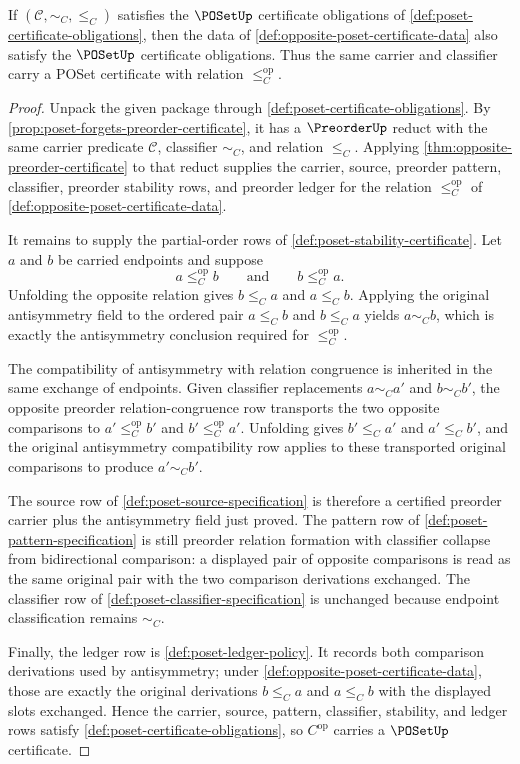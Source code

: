 \begin{theorem}
\label{thm:opposite-poset-certificate}
If $(\mathcal C,\sim_C,\le_C)$ satisfies the $\POSetUp$ certificate obligations of \autoref{def:poset-certificate-obligations}, then the data of \autoref{def:opposite-poset-certificate-data} also satisfy the $\POSetUp$ certificate obligations. Thus the same carrier and classifier carry a POSet certificate with relation $\le_C^{\mathrm{op}}$.
\end{theorem}
\begin{proof}
Unpack the given package through \autoref{def:poset-certificate-obligations}. By \autoref{prop:poset-forgets-preorder-certificate}, it has a $\PreorderUp$ reduct with the same carrier predicate $\mathcal C$, classifier $\sim_C$, and relation $\le_C$. Applying \autoref{thm:opposite-preorder-certificate} to that reduct supplies the carrier, source, preorder pattern, classifier, preorder stability rows, and preorder ledger for the relation $\le_C^{\mathrm{op}}$ of \autoref{def:opposite-poset-certificate-data}.

It remains to supply the partial-order rows of \autoref{def:poset-stability-certificate}. Let $a$ and $b$ be carried endpoints and suppose
$$
a\le_C^{\mathrm{op}} b
\qquad\text{and}\qquad
b\le_C^{\mathrm{op}} a.
$$
Unfolding the opposite relation gives $b\le_C a$ and $a\le_C b$. Applying the original antisymmetry field to the ordered pair $a\le_C b$ and $b\le_C a$ yields $a\sim_C b$, which is exactly the antisymmetry conclusion required for $\le_C^{\mathrm{op}}$.

The compatibility of antisymmetry with relation congruence is inherited in the same exchange of endpoints. Given classifier replacements $a\sim_C a'$ and $b\sim_C b'$, the opposite preorder relation-congruence row transports the two opposite comparisons to $a'\le_C^{\mathrm{op}} b'$ and $b'\le_C^{\mathrm{op}} a'$. Unfolding gives $b'\le_C a'$ and $a'\le_C b'$, and the original antisymmetry compatibility row applies to these transported original comparisons to produce $a'\sim_C b'$.

The source row of \autoref{def:poset-source-specification} is therefore a certified preorder carrier plus the antisymmetry field just proved. The pattern row of \autoref{def:poset-pattern-specification} is still preorder relation formation with classifier collapse from bidirectional comparison: a displayed pair of opposite comparisons is read as the same original pair with the two comparison derivations exchanged. The classifier row of \autoref{def:poset-classifier-specification} is unchanged because endpoint classification remains $\sim_C$.

Finally, the ledger row is \autoref{def:poset-ledger-policy}. It records both comparison derivations used by antisymmetry; under \autoref{def:opposite-poset-certificate-data}, those are exactly the original derivations $b\le_C a$ and $a\le_C b$ with the displayed slots exchanged. Hence the carrier, source, pattern, classifier, stability, and ledger rows satisfy \autoref{def:poset-certificate-obligations}, so $C^{\mathrm{op}}$ carries a $\POSetUp$ certificate.
\end{proof}

